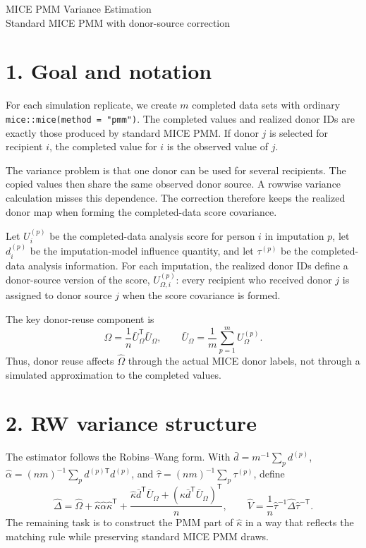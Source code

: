 \documentclass[11pt]{article}
\begin{document}
\begin{center}
{\Large MICE PMM Variance Estimation}\\[4pt]
{\normalsize Standard MICE PMM with donor-source correction}
\end{center}
\section*{1. Goal and notation}
For each simulation replicate, we create $m$ completed data sets with ordinary \texttt{mice::mice(method = "pmm")}. The completed values and realized donor IDs are exactly those produced by standard MICE PMM. If donor $j$ is selected for recipient $i$, the completed value for $i$ is the observed value of $j$.

The variance problem is that one donor can be used for several recipients. The copied values then share the same observed donor source. A rowwise variance calculation misses this dependence. The correction therefore keeps the realized donor map when forming the completed-data score covariance.

Let $U_i^{(p)}$ be the completed-data analysis score for person $i$ in imputation $p$, let $d_i^{(p)}$ be the imputation-model influence quantity, and let $\tau^{(p)}$ be the completed-data analysis information. For each imputation, the realized donor IDs define a donor-source version of the score, $U_{\Omega,i}^{(p)}$: every recipient who received donor $j$ is assigned to donor source $j$ when the score covariance is formed.

The key donor-reuse component is
\[
  \widehat{\Omega} = \frac{1}{n}\bar U_{\Omega}^{\mathsf T}\bar U_{\Omega},
  \qquad
  \bar U_{\Omega} = \frac{1}{m}\sum_{p=1}^m U_{\Omega}^{(p)}.
\]
Thus, donor reuse affects $\widehat{\Omega}$ through the actual MICE donor labels, not through a simulated approximation to the completed values.

\section*{2. RW variance structure}
The estimator follows the Robins--Wang form. With $\bar d=m^{-1}\sum_p d^{(p)}$, $\widehat{\alpha}=(nm)^{-1}\sum_p d^{(p)\mathsf T}d^{(p)}$, and $\widehat{\tau}=(nm)^{-1}\sum_p\tau^{(p)}$, define
\[
  \widehat{\Delta} = \widehat{\Omega} + \widehat{\kappa}\widehat{\alpha}\widehat{\kappa}^{\mathsf T}
  + \frac{\widehat{\kappa}\bar d^{\mathsf T}\bar U_{\Omega} + (\widehat{\kappa}\bar d^{\mathsf T}\bar U_{\Omega})^{\mathsf T}}{n},
  \qquad
  \widehat V = \frac{1}{n}\widehat{\tau}^{-1}\widehat{\Delta}\widehat{\tau}^{-\mathsf T}.
\]
The remaining task is to construct the PMM part of $\widehat{\kappa}$ in a way that reflects the matching rule while preserving standard MICE PMM draws.
\clearpage
\end{document}
